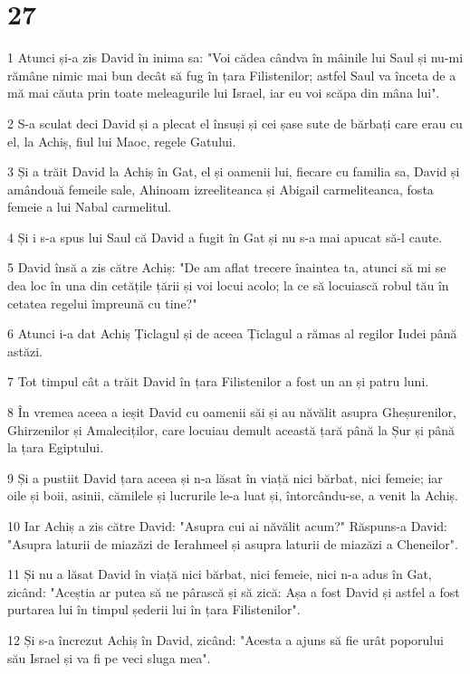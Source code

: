 \chapter{27}

\par 1 Atunci și-a zis David în inima sa: "Voi cădea cândva în mâinile lui Saul și nu-mi rămâne nimic mai bun decât să fug în țara Filistenilor; astfel Saul va înceta de a mă mai căuta prin toate meleagurile lui Israel, iar eu voi scăpa din mâna lui".
\par 2 S-a sculat deci David și a plecat el însuși și cei șase sute de bărbați care erau cu el, la Achiș, fiul lui Maoc, regele Gatului.
\par 3 Și a trăit David la Achiș în Gat, el și oamenii lui, fiecare cu familia sa, David și amândouă femeile sale, Ahinoam izreeliteanca și Abigail carmeliteanca, fosta femeie a lui Nabal carmelitul.
\par 4 Și i s-a spus lui Saul că David a fugit în Gat și nu s-a mai apucat să-l caute.
\par 5 David însă a zis către Achiș: "De am aflat trecere înaintea ta, atunci să mi se dea loc în una din cetățile țării și voi locui acolo; la ce să locuiască robul tău în cetatea regelui împreună cu tine?"
\par 6 Atunci i-a dat Achiș Țiclagul și de aceea Țiclagul a rămas al regilor Iudei până astăzi.
\par 7 Tot timpul cât a trăit David în țara Filistenilor a fost un an și patru luni.
\par 8 În vremea aceea a ieșit David cu oamenii săi și au năvălit asupra Gheșurenilor, Ghirzenilor și Amaleciților, care locuiau demult această țară până la Șur și până la țara Egiptului.
\par 9 Și a pustiit David țara aceea și n-a lăsat în viață nici bărbat, nici femeie; iar oile și boii, asinii, cămilele și lucrurile le-a luat și, întorcându-se, a venit la Achiș.
\par 10 Iar Achiș a zis către David: "Asupra cui ai năvălit acum?" Răspuns-a David: "Asupra laturii de miazăzi de Ierahmeel și asupra laturii de miazăzi a Cheneilor".
\par 11 Și nu a lăsat David în viață nici bărbat, nici femeie, nici n-a adus în Gat, zicând: "Aceștia ar putea să ne pârască și să zică: Așa a fost David și astfel a fost purtarea lui în timpul șederii lui în țara Filistenilor".
\par 12 Și s-a încrezut Achiș în David, zicând: "Acesta a ajuns să fie urât poporului său Israel și va fi pe veci sluga mea".

